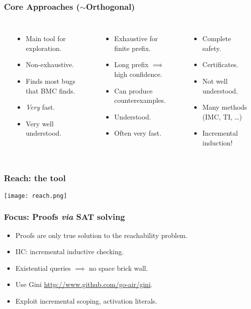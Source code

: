 \documentclass{beamer}
\begin{document}
\begin{frame}
	\frametitle{Core Approaches ($\sim$Orthogonal)}
	\begin{columns}
		\\


		\begin{itemize}
			\item Main tool for exploration.
			\item Non-exhaustive.
			\item Finds most bugs that BMC finds.
			\item {\em Very} fast.
			\item Very well understood.
		\end{itemize}

		\\
		\begin{itemize}
				\item Exhaustive for finite prefix.
				\item Long prefix $\implies$ high confidence.
				\item Can produce counterexamples.
				\item Understood.
				\item Often very fast.
		\end{itemize}

		\\
		\begin{itemize}
			\item Complete safety.
			\item Certificates.
			\item Not well understood.
			\item Many methods (IMC, TI, \ldots)
			\item Incremental induction!
		\end{itemize}

	\end{columns}
\end{frame}

\begin{frame}
	\frametitle{Reach: the tool}
	\begin{center}
	\texttt{[image: reach.png]}
	\end{center}
\end{frame}

\begin{frame}
	\frametitle{Focus: Proofs {\em via} SAT solving}
	\begin{itemize}
		\item Proofs are only true solution to the reachability problem.
		\item IIC: incremental inductive checking.
		\item Existential queries $\implies$ no space brick wall.
		\item Use Gini \url{http://www.github.com/go-air/gini}.
		\item Exploit incremental scoping, activation literals.
	\end{itemize}
\end{frame}
\end{document}
